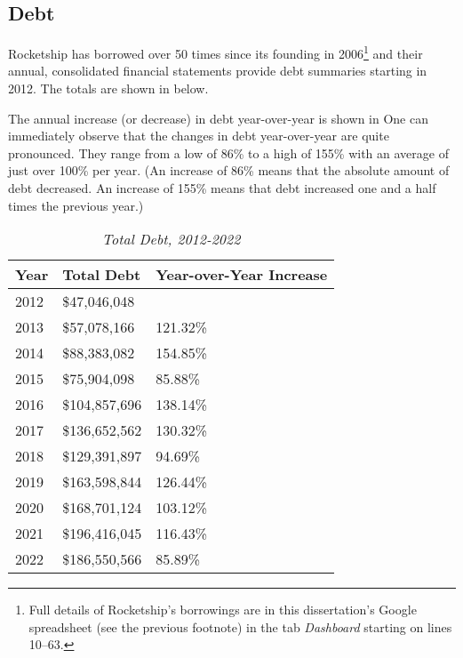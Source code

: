 

\subsection{Debt}\indent%
\label{sec:debt}

Rocketship has borrowed over 50 times since its founding in 2006\footnote{Full details of Rocketship's borrowings are in this dissertation's Google spreadsheet (see the previous footnote) in the tab \textit{Dashboard} starting on lines 10–63.} 
and their annual, consolidated financial statements provide debt summaries starting in 2012. The totals are shown in  below.

The annual increase (or decrease) in debt year-over-year is shown in  One can immediately observe that the changes in debt year-over-year are quite pronounced. They range from a low of 86\% to a high of 155\% with an average of just over 100\% per year. (An increase of 86\% means that the absolute amount of debt decreased. An increase of 155\% means that debt increased one and a half times the previous year.)

\begin{table}[ht]
  \caption[Total Debt, 2012-2022]{\textit{Total Debt, 2012-2022}}
  \label{tab:total_debt}
  \begin{tabular}{lll}
    \toprule
    \textbf{Year} & \textbf{Total Debt} & \textbf{Year-over-Year Increase}\\
    \midrule
    2012 &  \$47,046,048 & \\
    2013 &  \$57,078,166 & 121.32\% \\
    2014 &  \$88,383,082 & 154.85\% \\
    2015 &  \$75,904,098 &  85.88\% \\
    2016 & \$104,857,696 & 138.14\% \\
    2017 & \$136,652,562 & 130.32\% \\
    2018 & \$129,391,897 &  94.69\% \\
    2019 & \$163,598,844 & 126.44\% \\
    2020 & \$168,701,124 & 103.12\% \\ 
    2021 & \$196,416,045 & 116.43\% \\
    2022 & \$186,550,566 &  85.89\% \\
    \bottomrule
  \end{tabular}
\end{table}

